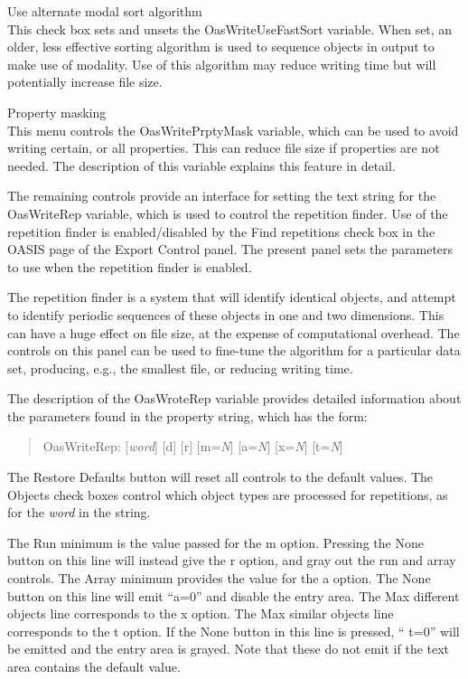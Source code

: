 \begin{description}
\item{\cb Use alternate modal sort algorithm}\\
This check box sets and unsets the {\et OasWriteUseFastSort} variable. 
When set, an older, less effective sorting algorithm is used to
sequence objects in output to make use of modality.  Use of this
algorithm may reduce writing time but will potentially increase file
size.

\item{\cb Property masking}\\
This menu controls the {\et OasWritePrptyMask} variable, which can be
used to avoid writing certain, or all properties.  This can reduce
file size if properties are not needed.  The description of this
variable explains this feature in detail.
\end{description}

The remaining controls provide an interface for setting the text
string for the {\et OasWriteRep} variable, which is used to control
the repetition finder.  Use of the repetition finder is
enabled/disabled by the {\cb Find repetitions} check box in the {\cb
OASIS} page of the {\cb Export Control} panel.  The present panel sets
the parameters to use when the repetition finder is enabled.

The repetition finder is a system that will identify identical
objects, and attempt to identify periodic sequences of these objects
in one and two dimensions.  This can have a huge effect on file size,
at the expense of computational overhead.  The controls on this panel
can be used to fine-tune the algorithm for a particular data set,
producing, e.g., the smallest file, or reducing writing time.

The description of the {\et OasWroteRep} variable provides detailed
information about the parameters found in the property string, which
has the form:
\begin{quote}
    {\et OasWriteRep}: [{\it word\/}] [{\vt d}] [{\vt r}]
     [{\vt m}={\it N\/}] [{\vt a}={\it N\/}] [{\vt x}={\it N\/}]
     [{\vt t}={\it N\/}]
\end{quote}

The {\cb Restore Defaults} button will reset all controls to the
default values.  The {\cb Objects} check boxes control which object
types are processed for repetitions, as for the {\it word} in the
string.

The {\cb Run minimum} is the value passed for the {\vt m} option. 
Pressing the {\cb None} button on this line will instead give the {\vt
r} option, and gray out the run and array controls.  The {\cb Array
minimum} provides the value for the {\vt a} option.  The {\cb None}
button on this line will emit ``{\vt a=0}'' and disable the entry
area.  The {\cb Max different objects} line corresponds to the {\vt x}
option.  The {\cb Max similar objects} line corresponds to the {\vt t}
option.  If the {\cb None} button in this line is pressed, ``{\vt
t=0}'' will be emitted and the entry area is grayed.  Note that these
do not emit if the text area contains the default value.

